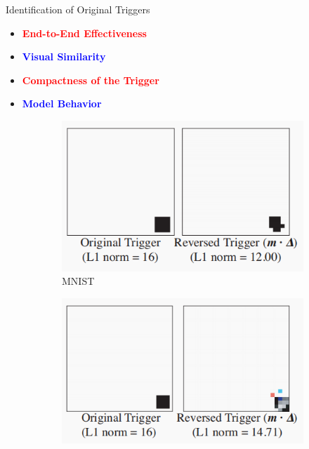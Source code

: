 \documentclass{beamer}
\begin{document}
\begin{frame}{Identification of Original Triggers}

    \begin{itemize}
        \item<1-> \textbf{\textcolor{red}{End-to-End Effectiveness}} 
        \item<2-> \textbf{\textcolor{blue}{Visual Similarity}} 
        \item<3-> \textbf{\textcolor{red}{Compactness of the Trigger}} 
        \item<4-> \textbf{\textcolor{blue}{Model Behavior}}
    \end{itemize}

    \begin{figure}[h!]
        \centering
            \begin{subfigure}{0.3\textwidth}
                \includegraphics[width=\textwidth]{MNIST.png} %
                \caption{MNIST}
                \label{fig:revtrigger1}
            \end{subfigure}
            \hfill
            \begin{subfigure}{0.3\textwidth}
                \includegraphics[width=\textwidth]{GTSRB.png} %

\end{subfigure}
\end{figure}
\end{frame}
\end{document}
